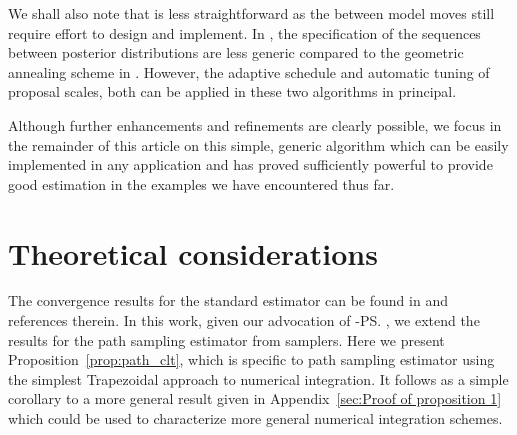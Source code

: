 We shall also note that \smc[1] is less straightforward as the between model
moves still require effort to design and implement. In \smc[3], the
specification of the sequences between posterior distributions are less
generic compared to the geometric annealing scheme in \smc[2]. However, the
adaptive schedule and automatic tuning of \mcmc proposal scales, both can be
applied in these two algorithms in principal.

Although further enhancements and refinements are clearly possible, we focus
in the remainder of this article on this simple, generic algorithm which can
be easily implemented in any application and has proved sufficiently powerful
to provide good estimation in the examples we have encountered thus far.

\section{Theoretical considerations}
\label{sec:Theoretical considerations}

The convergence results for the standard estimator can be found in
\cite{DelMoral:2006hc} and references therein. In this work, given our
advocation of \smc[2]-\ps, we extend the results for the path sampling
estimator from \smc samplers. Here we present Proposition~\ref{prop:path_clt},
which is specific to path sampling estimator using the simplest Trapezoidal
approach to numerical integration. It follows as a simple corollary to a more
general result given in Appendix~\ref{sec:Proof of proposition 1} which could
be used to characterize more general numerical integration schemes.

